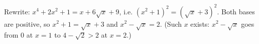 Rewrite: $x^4+2x^2+1=x+6\sqrt x+9$, i.e. $(x^2+1)^2=(\sqrt x+3)^2$. Both bases are positive, so $x^2+1=\sqrt x+3$ and $x^2-\sqrt x=\boxed{2}$. (Such $x$ exists: $x^2-\sqrt x$ goes from $0$ at $x=1$ to $4-\sqrt2>2$ at $x=2$.)
